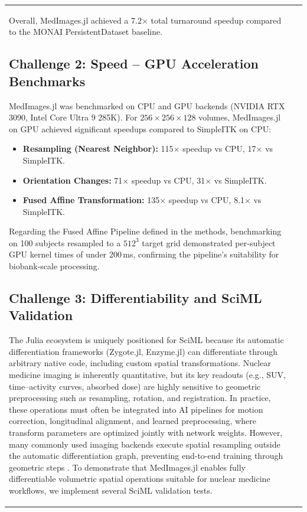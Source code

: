 \documentclass[10pt,letterpaper]{article}
\begin{document}
\begin{table}[H]
\begin{tabular}{|p{}|p{}|}
Overall, MedImages.jl achieved a 7.2$\times$ total turnaround speedup compared to the MONAI PersistentDataset baseline.

\subsection*{Challenge 2: Speed -- GPU Acceleration Benchmarks}
MedImages.jl was benchmarked on CPU and GPU backends (NVIDIA RTX 3090, Intel Core Ultra 9 285K). For $256 \times 256 \times 128$ volumes, MedImages.jl on GPU achieved significant speedups compared to SimpleITK on CPU:
\begin{itemize}
    \item \textbf{Resampling (Nearest Neighbor):} 115$\times$ speedup vs CPU, 17$\times$ vs SimpleITK.
    \item \textbf{Orientation Changes:} 71$\times$ speedup vs CPU, 31$\times$ vs SimpleITK.
    \item \textbf{Fused Affine Transformation:} 135$\times$ speedup vs CPU, 8.1$\times$ vs SimpleITK.
\end{itemize}

Regarding the Fused Affine Pipeline defined in the methods, benchmarking on 100 subjects resampled to a $512^3$ target grid demonstrated per-subject GPU kernel times of under 200\,ms, confirming the pipeline's suitability for biobank-scale processing.

\subsection*{Challenge 3: Differentiability and SciML Validation}
The Julia ecosystem is uniquely positioned for SciML because its automatic differentiation frameworks (Zygote.jl, Enzyme.jl) can differentiate through arbitrary native code, including custom spatial transformations. Nuclear medicine imaging is inherently quantitative, but its key readouts (e.g., SUV, time–activity curves, absorbed dose) are highly sensitive to geometric preprocessing such as resampling, rotation, and registration. In practice, these operations must often be integrated into AI pipelines for motion correction, longitudinal alignment, and learned preprocessing, where transform parameters are optimized jointly with network weights. However, many commonly used imaging backends execute spatial resampling outside the automatic differentiation graph, preventing end-to-end training through geometric steps \cite{Berman_2024}. To demonstrate that MedImages.jl enables fully differentiable volumetric spatial operations suitable for nuclear medicine workflows, we implement several SciML validation tests.


\end{tabular}
\end{table}
\end{document}

